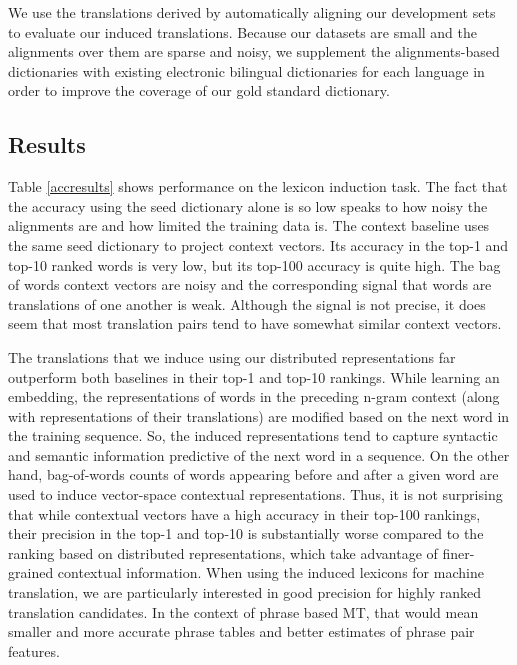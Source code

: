 \documentclass[11pt]{article}
\begin{document}
We use the translations derived by automatically aligning our development sets to evaluate our induced translations.
Because our datasets are small and the alignments over them are sparse and noisy, we supplement the alignments-based dictionaries with existing electronic bilingual dictionaries for each language in order to improve the coverage of our gold standard dictionary.

\subsection{Results}

Table \ref{accresults} shows performance on the lexicon induction task. 
The fact that the accuracy using the seed dictionary alone is so low speaks to how noisy the alignments are and how limited the training data is.
The context baseline uses the same seed dictionary to project context vectors.
Its accuracy in the top-1 and top-10 ranked words is very low, but its top-100 accuracy is quite high. 
The bag of words context vectors are noisy and the corresponding signal that words are translations of one another is weak. 
Although the signal is not precise, it does seem that most translation pairs tend to have somewhat similar context vectors.

The translations that we induce using our distributed representations far outperform both baselines in their top-1 and top-10 rankings. 
While learning an embedding, the representations of words in the preceding n-gram context (along with representations of their translations) are modified based on the next word in the training sequence.  
So, the induced representations tend to capture syntactic and semantic information predictive of the next word in a sequence.
On the other hand, bag-of-words counts of words appearing before and after a given word are used to induce vector-space contextual representations.  
Thus, it is not surprising that while contextual vectors have a high accuracy in their top-100 rankings, their precision in the top-1 and top-10 is substantially worse compared to the ranking based on distributed representations, which take advantage of finer-grained contextual information.
When using the induced lexicons for machine translation, we are particularly interested in good precision for highly ranked translation candidates. 
In the context of phrase based MT, that would mean smaller and more accurate phrase tables and better estimates of phrase pair features. 
\end{document}
